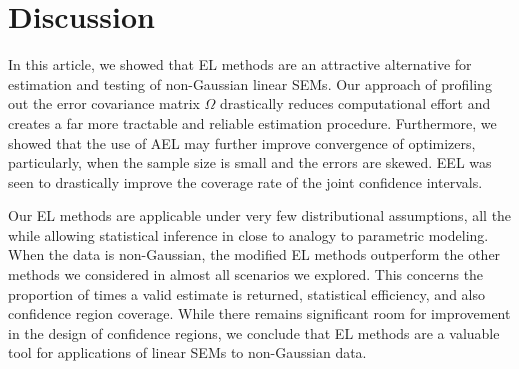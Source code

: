 \documentclass[notitlepage]{article}
\begin{document}
\section{Discussion}\label{sec:discussion}

In this article, we showed that EL methods are an attractive
alternative for estimation and testing of non-Gaussian linear SEMs.
Our approach of profiling out the error covariance matrix $\Omega$
drastically reduces computational effort and creates a far more
tractable and reliable estimation procedure.  Furthermore, we showed
that the use of AEL may further improve convergence of optimizers,
particularly, when the sample size is small and the errors are skewed.
EEL was seen to drastically improve the
coverage rate of the joint confidence intervals.

Our EL methods are applicable under very few distributional
assumptions, all the while allowing statistical inference in close to
analogy to parametric modeling.  When the data is non-Gaussian, the
modified EL methods outperform the other methods we considered in
almost all scenarios we explored.  This concerns the proportion of
times a valid estimate is returned, statistical efficiency, and also
confidence region coverage.
While there remains significant room for improvement in the design of
confidence regions,
we conclude that EL methods are a valuable tool for applications of
linear SEMs to non-Gaussian data.
\end{document}
